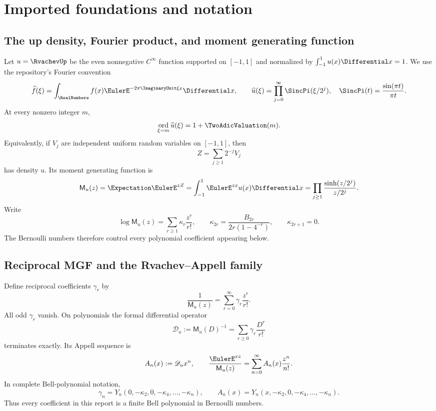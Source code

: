 \documentclass[11pt]{article}
\theoremstyle{definition}
\theoremstyle{remark}
\newcommand{\MM}{\mathsf M}
\newcommand{\Dscr}{\mathscr D_{u}}
\DeclareMathOperator{\ord}{ord}
\begin{document}
\section{Imported foundations and notation}
\label{sec:foundations}

\subsection{The up density, Fourier product, and moment generating function}

Let $u=\RvachevUp$ be the even nonnegative $C^\infty$ function supported on $[-1,1]$
and normalized by $\int_{-1}^1u(x)\Differential x=1$.  We use the repository's Fourier
convention
\[
 \widehat f(\xi)=\int_{\RealNumbers}f(x)\EulerE^{-2\pi\ImaginaryUnit\xi x}\Differential x,
 \qquad
 \widehat u(\xi)=\prod_{j=0}^{\infty}\SincPi(\xi/2^j),
 \quad
 \SincPi(t)=\frac{\sin(\pi t)}{\pi t}.
\]
At every nonzero integer $m$,
\[
 \ord_{\xi=m}\widehat u(\xi)=1+\TwoAdicValuation(m).
\]
Equivalently, if $V_j$ are independent uniform random variables on $[-1,1]$,
then
\[
 Z=\sum_{j\ge1}2^{-j}V_j
\]
has density $u$.  Its moment generating function is
\begin{equation}
 \MM_u(z)=\Expectation\EulerE^{zZ}
 =\int_{-1}^1\EulerE^{zx}u(x)\Differential x
 =\prod_{j\ge1}\frac{\sinh(z/2^j)}{z/2^j}.
 \label{eq:mgf}
\end{equation}
Write
\begin{equation}
 \log\MM_u(z)=\sum_{r\ge1}\kappa_r\frac{z^r}{r!},
 \qquad
 \kappa_{2r}=\frac{B_{2r}}{2r(1-4^{-r})},
 \qquad \kappa_{2r+1}=0.
 \label{eq:cumulants}
\end{equation}
The Bernoulli numbers therefore control every polynomial coefficient appearing
below.

\subsection{Reciprocal MGF and the Rvachev--Appell family}

Define reciprocal coefficients $\gamma_r$ by
\begin{equation}
 \frac1{\MM_u(z)}=\sum_{r=0}^{\infty}\gamma_r\frac{z^r}{r!}.
 \label{eq:gamma}
\end{equation}
All odd $\gamma_r$ vanish.  On polynomials the formal differential operator
\begin{equation}
 \Dscr:=\MM_u(D)^{-1}
 =\sum_{r\ge0}\gamma_r\frac{D^r}{r!}
 \label{eq:deconv}
\end{equation}
terminates exactly.  Its Appell sequence is
\begin{equation}
 A_n(x):=\Dscr x^n,
 \qquad
 \frac{\EulerE^{xz}}{\MM_u(z)}=\sum_{n=0}^{\infty}A_n(x)\frac{z^n}{n!}.
 \label{eq:appell}
\end{equation}
In complete Bell-polynomial notation,
\begin{equation}
 \gamma_n=Y_n(0,-\kappa_2,0,-\kappa_4,\ldots,-\kappa_n),
 \qquad
 A_n(x)=Y_n(x,-\kappa_2,0,-\kappa_4,\ldots,-\kappa_n).
 \label{eq:bell-form}
\end{equation}
Thus every coefficient in this report is a finite Bell polynomial in Bernoulli
numbers.
\end{document}
